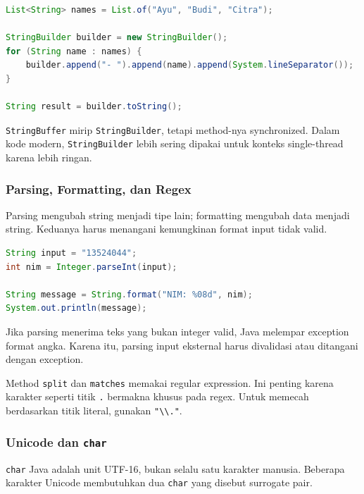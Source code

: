 \begin{lstlisting}[language=Java, caption={Membangun string dengan StringBuilder}, label={lst:stringbuilder}]
List<String> names = List.of("Ayu", "Budi", "Citra");

StringBuilder builder = new StringBuilder();
for (String name : names) {
    builder.append("- ").append(name).append(System.lineSeparator());
}

String result = builder.toString();
\end{lstlisting}

\texttt{StringBuffer} mirip \texttt{StringBuilder}, tetapi method-nya synchronized. Dalam kode modern, \texttt{StringBuilder} lebih sering dipakai untuk konteks single-thread karena lebih ringan.

\subsubsection{Parsing, Formatting, dan Regex}

\begin{jawab}
Parsing mengubah string menjadi tipe lain; formatting mengubah data menjadi string. Keduanya harus menangani kemungkinan format input tidak valid.
\end{jawab}

\begin{lstlisting}[language=Java, caption={Parsing dan formatting String}, label={lst:string-parsing-formatting}]
String input = "13524044";
int nim = Integer.parseInt(input);

String message = String.format("NIM: %08d", nim);
System.out.println(message);
\end{lstlisting}

Jika parsing menerima teks yang bukan integer valid, Java melempar exception format angka. Karena itu, parsing input eksternal harus divalidasi atau ditangani dengan exception.

Method \texttt{split} dan \texttt{matches} memakai regular expression. Ini penting karena karakter seperti titik \texttt{.} bermakna khusus pada regex. Untuk memecah berdasarkan titik literal, gunakan \texttt{"\textbackslash\textbackslash."}.

\subsubsection{Unicode dan \texttt{char}}

\begin{jawab}
\texttt{char} Java adalah unit UTF-16, bukan selalu satu karakter manusia. Beberapa karakter Unicode membutuhkan dua \texttt{char} yang disebut surrogate pair.
\end{jawab}


